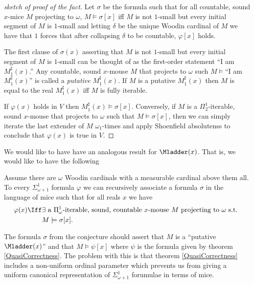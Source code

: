 \documentclass[oneside,12pt]{amsart}
\begin{document}
\begin{proof}[sketch of proof of the fact]
Let $\sigma$ be the formula such that for all countable, sound $x$-mice $M$ projecting to $\omega$, $M\models\sigma[x]$ iff
$M$ is not $1$-small but every initial segment of $M$ is $1$-small
and letting  $\delta$ be the unique Woodin cardinal of $M$
we have that $1$ forces that after collapsing
$\delta$ to be countable, $\varphi[x]$ holds.

The first clause of $\sigma(x)$ asserting that $M$ is not $1$-small but every initial segment of $M$ is $1$-small
can be thought of as the first-order statement ``I am $M_1^{\sharp}(x)$.''
Any countable, sound $x$-mouse $M$ that projects to $\omega$ such $M\models$``I am $M_1^{\sharp}(x)$'' is called a \emph{putative } $M_1^{\sharp}(x)$.
If $M$ is a putative $M_1^{\sharp}(x)$ then $M$ is equal to the real $M_1^{\sharp}(x)$ iff $M$ is fully iterable.

If $\varphi(x)$ holds in $V$ then $M_1^{\sharp}(x)\models \sigma[x]$. Conversely, if $M$ is a $\Pi^1_2$-iterable, sound $x$-mouse that projects to $\omega$ such
that $M\models\sigma[x]$, then we can simply iterate the last extender of $M$ $\omega_1$-times and apply Shoenfield absolutenss to conclude that $\varphi(x)$
is true in $V$.
\end{proof}

We would like to have have an analogous result for $\Mladder(x)$. That is, we would like to have the following

\begin{conjecture}
Assume there are $\omega$ Woodin cardinals with a measurable cardinal above them all. To every $\Sigma^1_{\omega+1}$ formula $\varphi$ we can recursively
associate a formula $\sigma$ in the language of mice such that for all reals $x$ we have
\begin{align*}
\varphi(x) \Iff &\exists \text{ a } \Pi^1_{\omega}\text{-iterable, sound, countable } x\text{-mouse } M \text{ projecting to $\omega$ s.t. } \\
                & M\models\sigma[x].
\end{align*}     
\end{conjecture}

The formula $\sigma$ from the conjecture should assert that $M$ is a ``putative $\Mladder(x)$'' and that $M\models\psi[x]$ where $\psi$ is the
formula given by theorem \ref{QuasiCorrectness}. The problem with this is that theorem \ref{QuasiCorrectness} includes a non-uniform ordinal
parameter which prevents us from giving a uniform canonical representation of $\Sigma^1_{\omega+1}$ forumulae in terms of mice.
\end{document}
